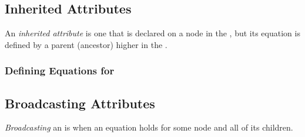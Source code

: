 \subsection{Inherited Attributes}\label{subsec:Inherited_Attributes}
\begin{definition}\label{def:Inherited_Attribute}
  An \emph{inherited attribute} is one that is declared on a node in the , but its equation is defined by a parent (ancestor) higher in the .
\end{definition}

\subsubsection{Defining Equations for }\label{subsubsec:Define_Inherited_Equations}

\subsection{Broadcasting Attributes}\label{subsec:Broadcasting_Attributes}
\begin{definition}[Broadcasting]\label{def:Broadcasting}
  \emph{Broadcasting} an  is when an equation holds for some node and all of its children.
\end{definition}

